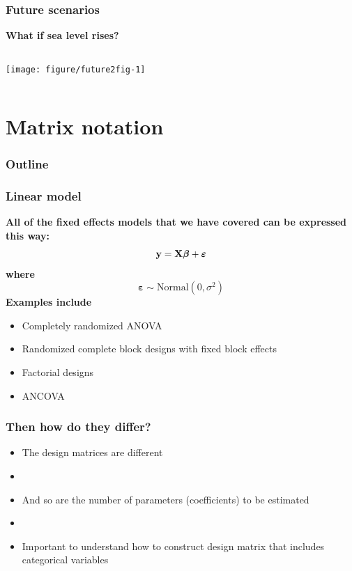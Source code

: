 \documentclass[color=usenames,dvipsnames]{beamer}\usepackage[]{graphicx}\usepackage[]{color}
\begin{document}
\begin{frame}[fragile]
  \frametitle{Future scenarios}
  {\bf What if sea level rises? \par}
  \scriptsize
  \pause


\begin{columns}
  \column{\dimexpr\paperwidth-10pt}
  \texttt{[image: figure/future2fig-1]}
\end{columns}
\end{frame}















\section{Matrix notation}


\begin{frame}
  \frametitle{Outline}
  \LARGE
\end{frame}





\begin{frame}
  \frametitle{Linear model}
  {\bf All of the fixed effects models that we have covered can be
    expressed this way:}
  \[
  {\bf y} = {\bf X}{\bm \beta} + {\bm \varepsilon}
  \]
  {\bf where}
  \[
  {\bm \varepsilon} \sim \mbox{Normal}(0, \sigma^2)
  \]
  \pause
  \vfill
  {\bf Examples include} \\
  \begin{itemize}
    \item Completely randomized ANOVA
    \item Randomized complete block designs with fixed block effects
    \item Factorial designs
    \item ANCOVA
  \end{itemize}
\end{frame}






\begin{frame}
  \frametitle{Then how do they differ?}
  \begin{itemize}%
  \large
    \item The design matrices are different
    \item[]
    \item And so are the number of parameters (coefficients) to be
      estimated
    \item[]
    \item Important to understand how to construct design matrix that
      includes categorical variables
  \end{itemize}
\end{frame}
\end{document}
